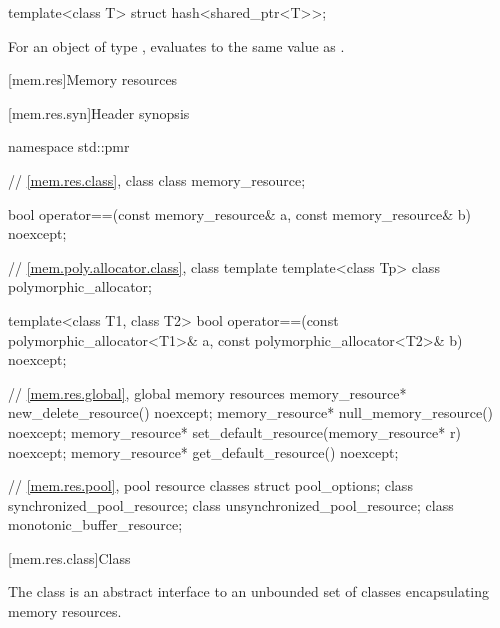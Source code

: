 %
\begin{itemdecl}
template<class T> struct hash<shared_ptr<T>>;
\end{itemdecl}

\begin{itemdescr}
\pnum
For an object  of type ,
 evaluates to
the same value as .
\end{itemdescr}%

[mem.res]{Memory resources}

[mem.res.syn]{Header  synopsis}

%
\begin{codeblock}
namespace std::pmr {
  // \ref{mem.res.class}, class 
  class memory_resource;

  bool operator==(const memory_resource& a, const memory_resource& b) noexcept;

  // \ref{mem.poly.allocator.class}, class template 
  template<class Tp> class polymorphic_allocator;

  template<class T1, class T2>
    bool operator==(const polymorphic_allocator<T1>& a,
                    const polymorphic_allocator<T2>& b) noexcept;

  // \ref{mem.res.global}, global memory resources
  memory_resource* new_delete_resource() noexcept;
  memory_resource* null_memory_resource() noexcept;
  memory_resource* set_default_resource(memory_resource* r) noexcept;
  memory_resource* get_default_resource() noexcept;

  // \ref{mem.res.pool}, pool resource classes
  struct pool_options;
  class synchronized_pool_resource;
  class unsynchronized_pool_resource;
  class monotonic_buffer_resource;
}
\end{codeblock}

[mem.res.class]{Class }

\pnum
The  class is an abstract interface to an unbounded set of classes encapsulating memory resources.


